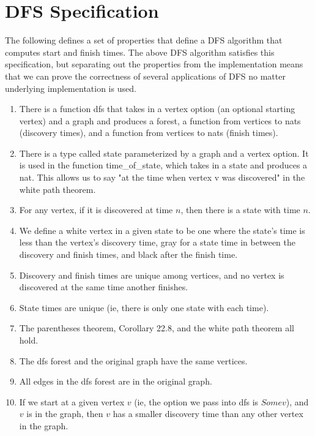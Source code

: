 \documentclass{article}
\begin{document}
\section{DFS Specification}
The following defines a set of properties that define a DFS algorithm that computes start and finish times. The above DFS algorithm satisfies this specification, but separating out the properties from the implementation means that we can prove the correctness of several applications of DFS no matter underlying implementation is used.
\begin{enumerate}
\item
There is a function dfs that takes in a vertex option (an optional starting vertex) and a graph and produces a forest, a function from vertices to nats (discovery times), and a function from vertices to nats (finish times).
\item
There is a type called state parameterized by a graph and a vertex option. It is used in the function time\_of\_state, which takes in a state and produces a nat. This allows us to say "at the time when vertex v was discovered" in the white path theorem.
\item
For any vertex, if it is discovered at time $n$, then there is a state with time $n$.
\item
We define a white vertex in a given state to be one where the state's time is less than the vertex's discovery time, gray for a state time in between the discovery and finish times, and black after the finish time.
\item
Discovery and finish times are unique among vertices, and no vertex is discovered at the same time another finishes.
\item
State times are unique (ie, there is only one state with each time).
\item
The parentheses theorem, Corollary 22.8, and the white path theorem all hold.
\item
The dfs forest and the original graph have the same vertices.
\item
All edges in the dfs forest are in the original graph.
\item
If we start at a given vertex $v$ (ie, the option we pass into dfs is $Some v$), and $v$ is in the graph, then $v$ has a smaller discovery time than any other vertex in the graph.
\end{enumerate}
\end{document}
